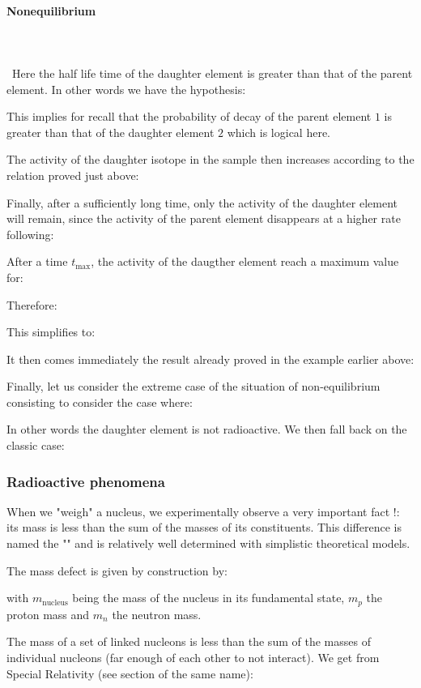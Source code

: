 	\paragraph{Nonequilibrium}\mbox{}\\\\\
	Here the half life time of the daughter element is greater than that of the parent element. In other words we have the hypothesis:
	
	This implies for recall that the probability of decay of the parent element $1$ is greater than that of the daughter element $2$ which is logical here.

	The activity of the daughter isotope in the sample then increases according to the relation proved just above:
	
	Finally, after a sufficiently long time, only the activity of the daughter element will remain, since the activity of the parent element disappears at a higher rate following:
	
	After a time $t_{\max}$, the activity of the daugther element reach a maximum value for:
	
	Therefore:
	
	This simplifies to:
	
	It then comes immediately the result already proved in the example earlier above:
	
	Finally, let us consider the extreme case of the situation of non-equilibrium consisting to consider the case where:
	
	In other words the daughter element is not radioactive. We then fall back on the classic case:
	
	
	\subsubsection{Radioactive phenomena}
	When we "weigh" a nucleus, we experimentally observe a very important fact !: its mass is less than the sum of the masses of its constituents. This difference is named the "" and is relatively well determined with simplistic theoretical models.

	The mass defect is given by construction by:
	
	with $m_\text{nucleus}$ being the mass of the nucleus in its fundamental state, $m_p$ the proton mass and $m_n$  the neutron mass.

	The mass of a set of linked nucleons is less than the sum of the masses of individual nucleons (far enough of each other to not interact). We get from Special Relativity (see section of the same name):
	

